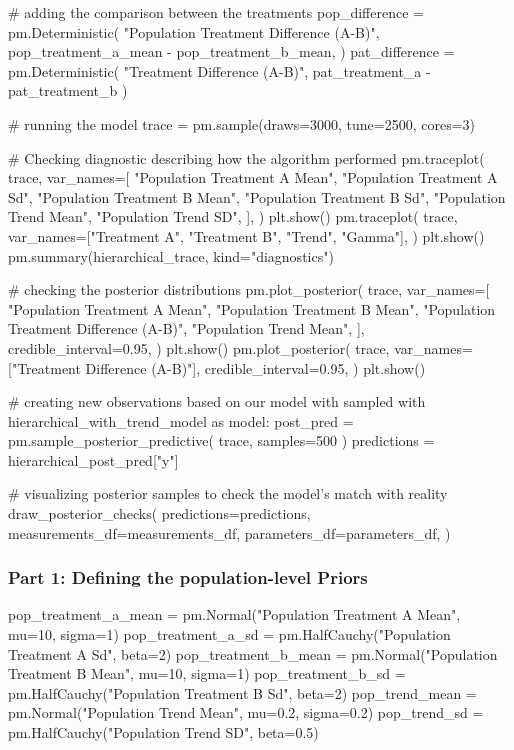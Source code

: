\documentclass[12pt,a4paper,leqno]{report}
\theoremstyle{plain}
\theoremstyle{definition}
\theoremstyle{remark}
\begin{document}
\begin{pyverbatim}[][fontsize=\footnotesize]
    # adding the comparison between the treatments
    pop_difference = pm.Deterministic(
        "Population Treatment Difference (A-B)",
        pop_treatment_a_mean - pop_treatment_b_mean,
    )
    pat_difference = pm.Deterministic(
        "Treatment Difference (A-B)", pat_treatment_a - pat_treatment_b
    )

    # running the model
    trace = pm.sample(draws=3000, tune=2500, cores=3)

    # Checking diagnostic describing how the algorithm performed
    pm.traceplot(
        trace,
        var_names=[
            "Population Treatment A Mean",
            "Population Treatment A Sd",
            "Population Treatment B Mean",
            "Population Treatment B Sd",
            "Population Trend Mean",
            "Population Trend SD",
        ],
    )
    plt.show()
    pm.traceplot(
        trace,
        var_names=["Treatment A", "Treatment B", "Trend", "Gamma"],
    )
    plt.show()
    pm.summary(hierarchical_trace, kind="diagnostics")

    # checking the posterior distributions
    pm.plot_posterior(
        trace,
        var_names=[
            "Population Treatment A Mean",
            "Population Treatment B Mean",
            "Population Treatment Difference (A-B)",
            "Population Trend Mean",
        ],
        credible_interval=0.95,
    )
    plt.show()
    pm.plot_posterior(
        trace,
        var_names=["Treatment Difference (A-B)"],
        credible_interval=0.95,
    )
    plt.show()

# creating new observations based on our model with sampled
with hierarchical_with_trend_model as model:
    post_pred = pm.sample_posterior_predictive(
        trace, samples=500
    )
    predictions = hierarchical_post_pred["y"]

# visualizing posterior samples to check the model's match with reality
draw_posterior_checks(
    predictions=predictions,
    measurements_df=measurements_df,
    parameters_df=parameters_df,
)
\end{pyverbatim}
\bigskip


\subsubsection*{Part 1: Defining the population-level Priors}

\bigskip
\begin{pyverbatim}[][fontsize=\footnotesize]
    pop_treatment_a_mean = pm.Normal("Population Treatment A Mean", mu=10, sigma=1)
    pop_treatment_a_sd = pm.HalfCauchy("Population Treatment A Sd", beta=2)
    pop_treatment_b_mean = pm.Normal("Population Treatment B Mean", mu=10, sigma=1)
    pop_treatment_b_sd = pm.HalfCauchy("Population Treatment B Sd", beta=2)
    pop_trend_mean = pm.Normal("Population Trend Mean", mu=0.2, sigma=0.2)
    pop_trend_sd = pm.HalfCauchy("Population Trend SD", beta=0.5)
\end{pyverbatim}
\bigskip
\end{document}
